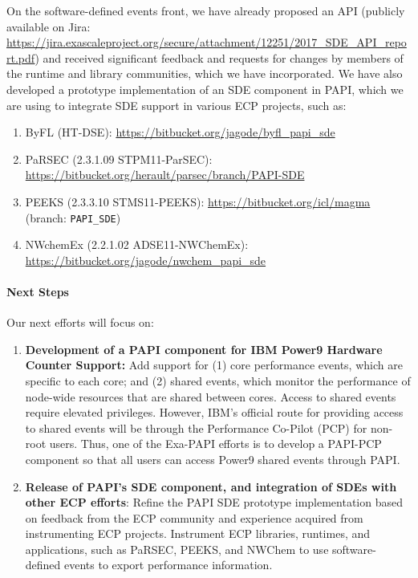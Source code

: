 On the software-defined events front, we have already proposed an API
(publicly available on Jira:
\url{https://jira.exascaleproject.org/secure/attachment/12251/2017_SDE_API_report.pdf})
and received significant feedback and requests for changes by members of the
runtime and library communities, which we have incorporated. We have also
developed a prototype implementation of an SDE component in PAPI, which we are
using to integrate SDE support in various ECP projects, such as:
%
\begin{enumerate}
\vspace{-3pt}
\item ByFL (HT-DSE): \url{https://bitbucket.org/jagode/byfl_papi_sde}
\vspace{-5pt}
\item PaRSEC (2.3.1.09 STPM11-ParSEC): \url{https://bitbucket.org/herault/parsec/branch/PAPI-SDE}
\vspace{-5pt}
\item PEEKS (2.3.3.10 STMS11-PEEKS): \url{https://bitbucket.org/icl/magma} (branch: \verb+PAPI_SDE+)
\vspace{-5pt}
\item NWchemEx (2.2.1.02 ADSE11-NWChemEx): \url{https://bitbucket.org/jagode/nwchem_papi_sde}
\end{enumerate}

\paragraph{Next Steps}

Our next efforts will focus on:
\begin{enumerate}
\item \textbf{Development of a PAPI component for IBM Power9 Hardware Counter
	Support:} Add support for (1) core performance events, which are specific
		to each core; and (2) shared events, which monitor the performance of
		node-wide resources that are shared between cores. Access to shared
		events require elevated privileges. However, IBM's official route for providing
		access to shared events will be through the
		Performance Co-Pilot (PCP) for non-root users. Thus, one of the
		Exa-PAPI efforts is to develop a PAPI-PCP component so that all users
		can access Power9 shared events through PAPI.
%
\item \textbf{Release of PAPI's SDE component, and integration of SDEs with other ECP efforts}: 
		Refine the PAPI SDE prototype implementation based on
		feedback from the ECP community and experience acquired from
		instrumenting ECP projects. Instrument ECP libraries, runtimes, and
		applications, such as PaRSEC, PEEKS, and NWChem to use software-defined
		events to export performance information.
\end{enumerate}
